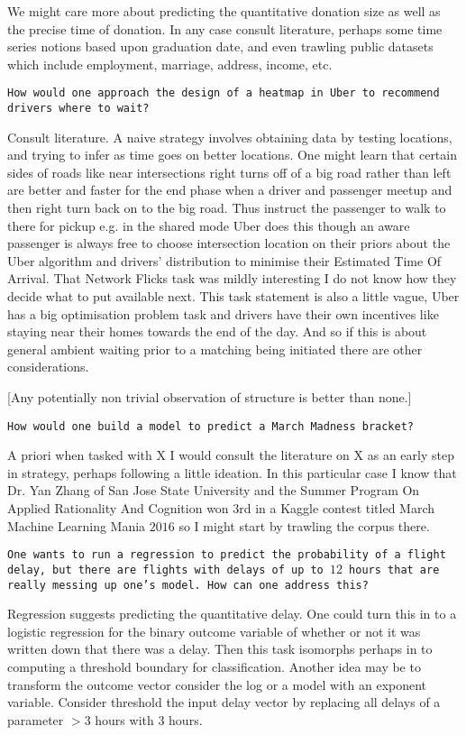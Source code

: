 We might care more about predicting the quantitative donation size as well as the precise time of donation. In any case consult literature, perhaps some time series notions based upon graduation date, and even trawling public datasets which include employment, marriage, address, income, etc.

\texttt{How would one approach the design of a heatmap in Uber to recommend drivers where to wait?}

Consult literature. A naive strategy involves obtaining data by testing locations, and trying to infer as time goes on better locations. One might learn that certain sides of roads like near intersections right turns off of a big road rather than left are better and faster for the end phase when a driver and passenger meetup and then right turn back on to the big road. Thus instruct the passenger to walk to there for pickup e.g. in the shared mode Uber does this though an aware passenger is always free to choose intersection location on their priors about the Uber algorithm and drivers' distribution to minimise their Estimated Time Of Arrival. That Network Flicks task was mildly interesting I do not know how they decide what to put available next. This task statement is also a little vague, Uber has a big optimisation problem task and drivers have their own incentives like staying near their homes towards the end of the day. And so if this is about general ambient waiting prior to a matching being initiated there are other considerations.

[Any potentially non trivial observation of structure is better than none.]

\texttt{How would one build a model to predict a March Madness bracket?}

A priori when tasked with X I would consult the literature on X as an early step in strategy, perhaps following a little ideation. In this particular case I know that Dr. Yan Zhang of San Jose State University and the Summer Program On Applied Rationality And Cognition won $3$rd in a Kaggle contest titled March Machine Learning Mania $2016$ so I might start by trawling the corpus there.

\texttt{One wants to run a regression to predict the probability of a flight delay, but there are flights with delays of up to $12$ hours that are really messing up one's model. How can one address this?}

Regression suggests predicting the quantitative delay. One could turn this in to a logistic regression for the binary outcome variable of whether or not it was written down that there was a delay. Then this task isomorphs perhaps in to computing a threshold boundary for classification. Another idea may be to transform the outcome vector consider the log or a model with an exponent variable. Consider threshold the input delay vector by replacing all delays of a parameter $>3$ hours with $3$ hours.


